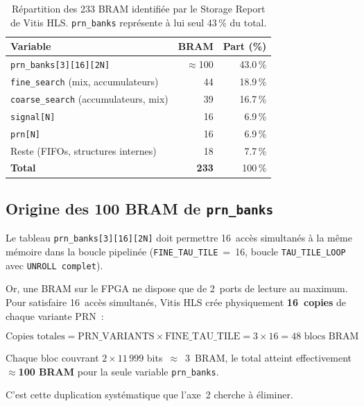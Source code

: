 \documentclass[11pt,a4paper]{article}
\begin{document}
\begin{table}[H]
\centering
\renewcommand{\arraystretch}{1.3}
\begin{tabular}{lrr}
\toprule
\textbf{Variable} & \textbf{BRAM} & \textbf{Part (\%)} \\
\midrule
\texttt{prn\_banks[3][16][2N]} & $\approx$100 & 43.0\,\% \\
\texttt{fine\_search} (mix, accumulateurs) & 44 & 18.9\,\% \\
\texttt{coarse\_search} (accumulateurs, mix) & 39 & 16.7\,\% \\
\texttt{signal[N]} & 16 & 6.9\,\% \\
\texttt{prn[N]} & 16 & 6.9\,\% \\
Reste (FIFOs, structures internes) & 18 & 7.7\,\% \\
\midrule
\textbf{Total} & \textbf{233} & 100\,\% \\
\bottomrule
\end{tabular}
\caption{Répartition des 233 BRAM identifiée par le Storage Report de Vitis HLS. \texttt{prn\_banks} représente à lui seul 43\,\% du total.}
\end{table}

\subsection{Origine des 100 BRAM de \texttt{prn\_banks}}

Le tableau \texttt{prn\_banks[3][16][2N]} doit permettre 16~accès simultanés à la même mémoire dans la boucle pipelinée (\texttt{FINE\_TAU\_TILE}~=~16, boucle \texttt{TAU\_TILE\_LOOP} avec \texttt{UNROLL complet}).

Or, une BRAM sur le FPGA ne dispose que de 2~ports de lecture au maximum. Pour satisfaire 16~accès simultanés, Vitis HLS crée physiquement \textbf{16~copies} de chaque variante PRN~:

\begin{equation}
\text{Copies totales} = \text{PRN\_VARIANTS} \times \text{FINE\_TAU\_TILE} = 3 \times 16 = 48 \text{ blocs BRAM}
\end{equation}

Chaque bloc couvrant $2 \times 11\,999$ bits~$\approx$~3~BRAM, le total atteint effectivement \textbf{$\approx$100 BRAM} pour la seule variable \texttt{prn\_banks}.

C'est cette duplication systématique que l'axe~2 cherche à éliminer.

\end{document}
